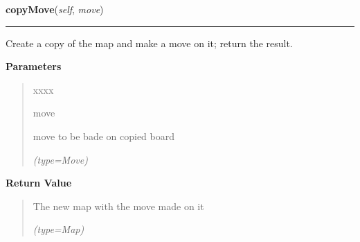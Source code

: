     \label{UnBlockMe:Map:Map:Map:copyMove}

    \vspace{0.5ex}

\hspace{.8\funcindent}\begin{boxedminipage}{\funcwidth}

    \raggedright \textbf{copyMove}(\textit{self}, \textit{move})

    \vspace{-1.5ex}

    \rule{\textwidth}{0.5\fboxrule}
\setlength{\parskip}{2ex}
    Create a copy of the map and make a move on it; return the result.

\setlength{\parskip}{1ex}
      \textbf{Parameters}
      \vspace{-1ex}

      \begin{quote}
        \begin{Ventry}{xxxx}

          \item[move]

          move to be bade on copied board

            {\it (type=Move)}

        \end{Ventry}

      \end{quote}

      \textbf{Return Value}
    \vspace{-1ex}

      \begin{quote}
      The new map with the move made on it

      {\it (type=Map)}

      \end{quote}

    \end{boxedminipage}

    \label{UnBlockMe:Map:Map:Map:copyConfidentMove}

    \vspace{0.5ex}

